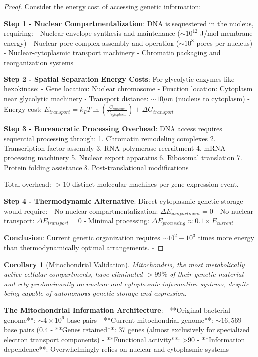 \documentclass[12pt,a4paper]{article}
\newtheorem{corollary}[theorem]{Corollary}
\begin{document}
\begin{proof}
Consider the energy cost of accessing genetic information:

\textbf{Step 1 - Nuclear Compartmentalization}: DNA is sequestered in the nucleus, requiring:
- Nuclear envelope synthesis and maintenance ($\sim 10^{12}$ J/mol membrane energy)
- Nuclear pore complex assembly and operation ($\sim 10^{8}$ pores per nucleus)
- Nuclear-cytoplasmic transport machinery
- Chromatin packaging and reorganization systems

\textbf{Step 2 - Spatial Separation Energy Costs}: For glycolytic enzymes like hexokinase:
- Gene location: Nuclear chromosome
- Function location: Cytoplasm near glycolytic machinery
- Transport distance: $\sim 10\mu m$ (nucleus to cytoplasm)
- Energy cost: $E_{transport} = k_B T \ln\left(\frac{C_{nucleus}}{C_{cytoplasm}}\right) + \Delta G_{transport}$

\textbf{Step 3 - Bureaucratic Processing Overhead}: 
DNA access requires sequential processing through:
1. Chromatin remodeling complexes
2. Transcription factor assembly
3. RNA polymerase recruitment
4. mRNA processing machinery
5. Nuclear export apparatus
6. Ribosomal translation
7. Protein folding assistance
8. Post-translational modifications

Total overhead: $>10$ distinct molecular machines per gene expression event.

\textbf{Step 4 - Thermodynamic Alternative}: Direct cytoplasmic genetic storage would require:
- No nuclear compartmentalization: $\Delta E_{compartment} = 0$
- No nuclear transport: $\Delta E_{transport} = 0$  
- Minimal processing: $\Delta E_{processing} \approx 0.1 \times E_{current}$

\textbf{Conclusion}: Current genetic organization requires $\sim 10^2-10^3$ times more energy than thermodynamically optimal arrangements. $\square$
\end{proof}

\begin{corollary}[Mitochondrial Validation]
Mitochondria, the most metabolically active cellular compartments, have eliminated $>99\%$ of their genetic material and rely predominantly on nuclear and cytoplasmic information systems, despite being capable of autonomous genetic storage and expression.
\end{corollary}

\textbf{The Mitochondrial Information Architecture}:
- **Original bacterial genome**: $\sim 4 \times 10^6$ base pairs
- **Current mitochondrial genome**: $\sim 16,569$ base pairs (0.4%
- **Genes retained**: 37 genes (almost exclusively for specialized electron transport components)
- **Functional activity**: >90%
- **Information dependence**: Overwhelmingly relies on nuclear and cytoplasmic systems
\end{document}
